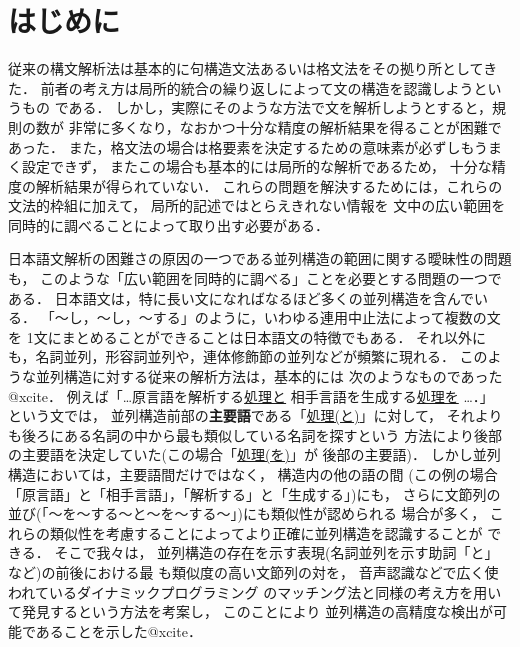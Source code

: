 

\maketitle

\section{はじめに}

従来の構文解析法は基本的に句構造文法あるいは格文法をその拠り所としてきた．
前者の考え方は局所的統合の繰り返しによって文の構造を認識しようというもの
である．
しかし，実際にそのような方法で文を解析しようとすると，規則の数が
非常に多くなり，なおかつ十分な精度の解析結果を得ることが困難であった．
また，格文法の場合は格要素を決定するための意味素が必ずしもうまく設定できず，
またこの場合も基本的には局所的な解析であるため，
十分な精度の解析結果が得られていない．
これらの問題を解決するためには，これらの文法的枠組に加えて，
局所的記述ではとらえきれない情報を
文中の広い範囲を同時的に調べることによって取り出す必要がある．

日本語文解析の困難さの原因の一つである並列構造の範囲に関する曖昧性の問題も，
このような「広い範囲を同時的に調べる」ことを必要とする問題の一つである．
日本語文は，特に長い文になればなるほど多くの並列構造を含んでいる．
「〜し，〜し，〜する」のように，いわゆる連用中止法によって複数の文を
1文にまとめることができることは日本語文の特徴でもある．
それ以外にも，名詞並列，形容詞並列や，連体修飾節の並列などが頻繁に現れる．
このような並列構造に対する従来の解析方法は，基本的には
次のようなものであった@xcite．
例えば「\ldots 原言語を解析する\underline{処理と}
相手言語を生成する\underline{処理を} \ldots ．」
という文では，
並列構造前部の{\bf 主要語}である「\underline{処理(と)}」に対して，
それよりも後ろにある名詞の中から最も類似している名詞を探すという
方法により後部の主要語を決定していた(この場合「\underline{処理(を)}」が
後部の主要語)．
しかし並列構造においては，主要語間だけではなく，
構造内の他の語の間
(この例の場合「原言語」と「相手言語」，「解析する」と「生成する」)にも，
さらに文節列の並び(「〜を〜する〜と〜を〜する〜」)にも類似性が認められる
場合が多く，
これらの類似性を考慮することによってより正確に並列構造を認識することが
できる．
そこで我々は，
並列構造の存在を示す表現(名詞並列を示す助詞「と」など)の前後における最
も類似度の高い文節列の対を，
音声認識などで広く使われているダイナミックプログラミング
のマッチング法と同様の考え方を用いて発見するという方法を考案し，
このことにより
並列構造の高精度な検出が可能であることを示した@xcite．


